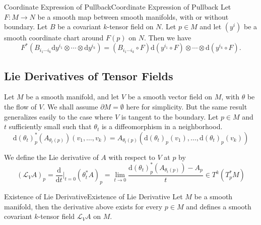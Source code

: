 \documentclass[../main.tex]{subfiles}
\begin{document}
\begin{corollary}{Coordinate Expression of Pullback}{Coordinate Expression of Pullback}
  Let $F: M \to N$ be a smooth map between smooth manifolds, with or without boundary. Let $B$ be a covariant $k$-tensor field on $N$. Let $p\in M$ and let $(y^i)$ be a smooth coordinate chart around $F(p)$ on $N$. Then we have
  \begin{equation}
    F^*(B_{i_1 \cdots i_k} \mathrm{d} y^{i_1} \otimes \cdots \otimes \mathrm{d} y^{i_k}) = (B_{i_1 \cdots i_k} \circ F) \mathrm{d}(y^{i_1} \circ F) \otimes \cdots \otimes \mathrm{d}(y^{i_k} \circ F).
  \end{equation}
\end{corollary}

\subsection{Lie Derivatives of Tensor Fields}
Let $M$ be a smooth manifold, and let $V$ be a smooth vector field on $M$, with $\theta$ be the flow of $V$. We shall assume $\partial M = \emptyset $ here for simplicity. But the same result generalizes easily to the case where $V$ is tangent to the boundary. Let $p\in M$ and $t$ sufficiently small such that $\theta_t$ is a diffeomorphism in a neighborhood.
\begin{equation*}
  \mathrm{d} (\theta_t)_p^* (A_{\theta_t(p)})(v_1, \ldots, v_k) = A_{\theta_t(p)}(\mathrm{d} (\theta_t)_p(v_1), \ldots, \mathrm{d} (\theta_t)_p(v_k))
\end{equation*}

We define the Lie derivative of $A$ with respect to $V$ at $p$ by
\begin{equation}
  (\mathcal{L}_V A)_p = \frac{\mathrm{d} }{\mathrm{d} t}\Big|_{t = 0} (\theta_t^* A)_p = \lim_{t \to 0} \frac{\mathrm{d} (\theta_t)_p^* (A_{\theta_t(p)}) - A_p}{t} \in T^k(T_p^* M)
\end{equation}

\begin{lemma}{Existence of Lie Derivative}{Existence of Lie Derivative}
  Let $M$ be a smooth manifold, then the derivative above exists for every $p\in M$ and defines a smooth covariant $k$-tensor field $\mathcal{L}_V A$ on $M$.
\end{lemma}
\end{document}
